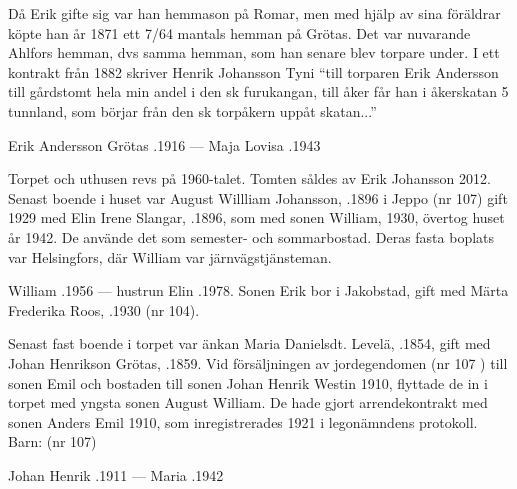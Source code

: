 Då Erik gifte sig var han hemmason på Romar, men med hjälp av sina föräldrar köpte han år 1871 ett 7/64 mantals hemman på Grötas. Det var nuvarande Ahlfors hemman, dvs samma hemman, som han senare blev torpare under. I ett kontrakt från 1882 skriver Henrik Johansson Tyni ``till torparen Erik Andersson till gårdstomt hela min andel i den sk furukangan, till åker får han i åkerskatan 5 tunnland, som börjar från den sk torpåkern uppåt skatan...''

Erik Andersson Grötas .1916  ---  Maja Lovisa .1943






Torpet och uthusen revs på 1960-talet. Tomten såldes av Erik Johansson 2012. Senast boende i huset var August Willliam Johansson, .1896 i Jeppo (nr 107) gift 1929 med Elin Irene Slangar, .1896, som med sonen William,  1930, övertog huset år 1942. De använde det som semester- och sommarbostad. Deras fasta boplats var Helsingfors, där William var järnvägstjänsteman.

William .1956  ---  hustrun Elin .1978.
Sonen Erik bor i Jakobstad, gift med Märta Frederika Roos, .1930 (nr 104).


Senast fast boende i torpet var änkan Maria Danielsdt. Levelä, .1854, gift med Johan Henrikson Grötas, .1859. Vid försäljningen av jordegendomen (nr 107 ) till sonen Emil och bostaden till sonen Johan Henrik Westin 1910, flyttade de in i torpet med yngsta sonen August William. De hade gjort arrendekontrakt med sonen Anders Emil 1910, som inregistrerades 1921 i legonämndens protokoll.  Barn: (nr 107)

Johan Henrik .1911  ---  Maria .1942


